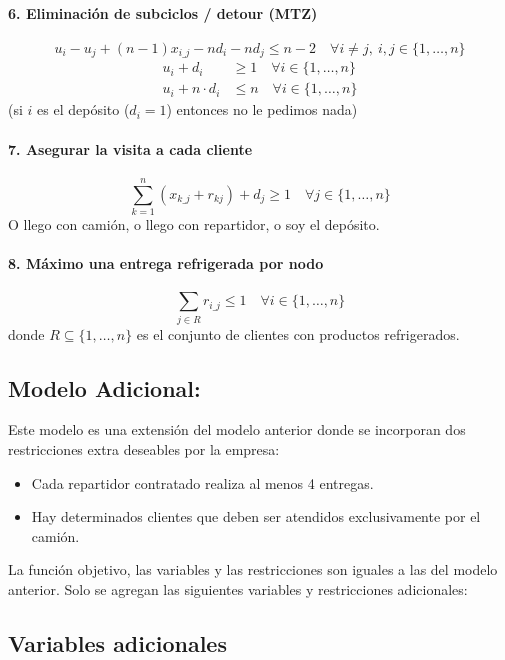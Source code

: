 \documentclass{article}
\begin{document}
\paragraph{6. Eliminación de subciclos / detour (MTZ)} 
\[
u_i - u_j + (n - 1) x_{i\_j} - n d_i - n d_j \leq n - 2 \quad \forall i \ne j,\ i,j \in \{1, \dots, n\}
\]
\begin{align*}
u_i + d_i &\geq 1 \quad \forall i \in \{1, \dots, n\} \\
u_i + n \cdot d_i &\leq n \quad \forall i \in \{1, \dots, n\}
\end{align*}
(si $i$ es el depósito ($d_i=1$) entonces no le pedimos nada)

\paragraph{7. Asegurar la visita a cada cliente}
\[
\sum_{k=1}^{n} (x_{k\_j} + r_{kj}) + d_j \geq 1 \quad \forall j \in \{1, \dots, n\}
\]
O llego con camión, o llego con repartidor, o soy el depósito.

\paragraph{8. Máximo una entrega refrigerada por nodo}
\[
\sum_{j \in R} r_{i\_j} \leq 1 \quad \forall i \in \{1, \dots, n\}
\]
donde \( R \subseteq \{1, \dots, n\} \) es el conjunto de clientes con productos refrigerados.




\subsection{Modelo Adicional:} \label{modelo1}

Este modelo es una extensión del modelo anterior donde se incorporan dos restricciones extra deseables por la empresa: 
\begin{itemize}
    \item Cada repartidor contratado realiza al menos 4 entregas.
    \item Hay determinados clientes que deben ser atendidos exclusivamente por el camión.
\end{itemize}
La función objetivo, las variables y las restricciones son iguales a las del modelo anterior. Solo se agregan las siguientes variables y restricciones adicionales:

\subsection*{Variables adicionales}
\end{document}
